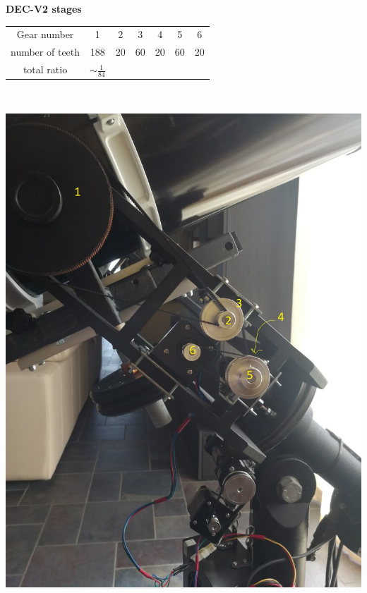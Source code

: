 \documentclass{article}
\begin{document}
\begin{multicols}{2}
        \begin{minipage}
            {0.5\textwidth}
            \centering
            \textbf{DEC-V2 stages}\\
            \begin{tabular}{ccccccc}
                \hline
                Gear number & 1 & 2 & 3 & 4 & 5 & 6\\
                number of teeth & 188 & 20 & 60 & 20 & 60 & 20\\
                \hline
                total ratio & \(\sim \frac{1}{84}\) &&&
            \end{tabular}
            \label{tab:DEC_gear_spec_v2}
        \end{minipage}
        \\
        \begin{minipage}
            {0.5\textwidth}
            \centering
            \includegraphics[scale=.2]{DEC_v2.jpg}
            \label{fig:DEC_mechanism_v2}
        \end{minipage}
    

\end{multicols}
\end{document}
